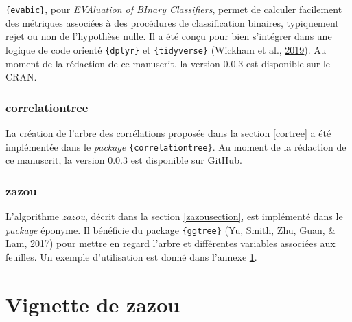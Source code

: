 \documentclass[12pt,a4paper]{reedthesis}
\theoremstyle{definition}
\theoremstyle{definition}
\theoremstyle{definition}
\theoremstyle{remark}
\begin{document}
\texttt{\{evabic\}}, pour \emph{EVAluation of BInary Classifiers}, permet de calculer facilement des métriques associées à des procédures de classification binaires, typiquement rejet ou non de l'hypothèse nulle. Il a été conçu pour bien s'intégrer dans une logique de code orienté \texttt{\{dplyr\}} et \texttt{\{tidyverse\}} (Wickham et al., \protect\hyperlink{ref-tidyverse2019}{2019}). Au moment de la rédaction de ce manuscrit, la version \(0.0.3\) est disponible sur le CRAN.

\hypertarget{correlationtree}{%
\subsection*{correlationtree}\label{correlationtree}}

La création de l'arbre des corrélations proposée dans la section \ref{cortree} a été implémentée dans le \emph{package} \texttt{\{correlationtree\}}. Au moment de la rédaction de ce manuscrit, la version \(0.0.3\) est disponible sur GitHub.

\hypertarget{zazou}{%
\subsection*{zazou}\label{zazou}}

L'algorithme \emph{zazou}, décrit dans la section \ref{zazousection}, est implémenté dans le \emph{package} éponyme. Il bénéficie du package \texttt{\{ggtree\}} (Yu, Smith, Zhu, Guan, \& Lam, \protect\hyperlink{ref-yu2017ggtree}{2017}) pour mettre en regard l'arbre et différentes variables associées aux feuilles. Un exemple d'utilisation est donné dans l'annexe \ref{vignette}.

\hypertarget{vignette}{%
\chapter{Vignette de zazou}\label{vignette}}
\end{document}
